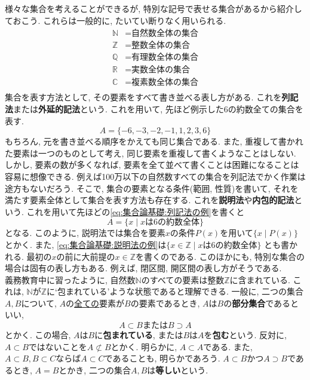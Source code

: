         様々な集合を考えることができるが, 特別な記号で表せる集合があるから紹介しておこう. これらは一般的に, たいてい断りなく用いられる.
        \begin{align*}
            \mathbb{N}&=\text{自然数全体の集合}\\
            \mathbb{Z}&=\text{整数全体の集合}\\
            \mathbb{Q}&=\text{有理数全体の集合}\\
            \mathbb{R}&=\text{実数全体の集合}\\
            \mathbb{C}&=\text{複素数全体の集合}\\
        \end{align*}
        集合を表す方法として, その要素をすべて書き並べる表し方がある. これを\textbf{列記法}または\textbf{外延的記法}という.
        これを用いて, 先ほど例示した6の約数全ての集合を表す.
        \begin{equation}
            A=\{-6,-3,-2,-1,1,2,3,6\} \label{eq:集合論基礎:列記法の例}
        \end{equation}
        もちろん, 元を書き並べる順序をかえても同じ集合である. また, 重複して書かれた要素は一つのものとして考え, 同じ要素を重複して書くようなことはしない.
        しかし, 要素の数が多くなれば, 要素を全て並べて書くことは困難になることは容易に想像できる. 例えば100万以下の自然数すべての集合を列記法でかく作業は途方もないだろう.
        そこで, 集合の要素となる条件(範囲, 性質)を書いて, それを満たす要素全体として集合を表す方法も存在する. これを\textbf{説明法}や\textbf{内包的記法}という.
        これを用いて先ほどの\eqref{eq:集合論基礎:列記法の例}を書くと
        \begin{equation}
            A=\{x\mid\text{$x$は6の約数全体}\} \label{eq:集合論基礎:説明法の例}
        \end{equation}
        となる. このように, 説明法では集合を要素$x$の条件$P(x)$を用いて$\{x\mid P(x)\}$とかく. また, \eqref{eq:集合論基礎:説明法の例}は$\{x\in\mathbb{Z}\mid\text{$x$は6の約数全体}\}$
        とも書かれる. 最初の$x$の前に大前提の$x\in\mathbb{Z}$を書くのである. このほかにも, 特別な集合の場合は固有の表し方もある. 例えば, 閉区間, 開区間の表し方がそうである.\\

        義務教育中に習ったように, 自然数$\mathbb{N}$のすべての要素は整数$\mathbb{Z}$に含まれている. これは, $\mathbb{N}$が$\mathbb{Z}$に`包まれている'ような状態であると理解できる.
        一般に, 二つの集合$A,B$について, $A$の\underline{全ての}要素が$B$の要素であるとき, $A$は$B$の\textbf{部分集合}であるといい,
        \begin{equation}
            A \subset B \text{または} B \supset A \label{eq:集合論基礎:部分集合の表記}
        \end{equation} 
        とかく. この場合, $A$は$B$に\textbf{包まれている}, または$B$は$A$を\textbf{包む}という. 反対に, $A\subset B$ではないことを$A\not\subset B$とかく.
        明らかに, $A\subset A$である. また, $A\subset B,B\subset C$ならば$A\subset C$であることも, 明らかであろう. 
        $A\subset B$かつ$A \supset B$であるとき, $A=B$とかき, 二つの集合$A,B$は\textbf{等しい}という.

